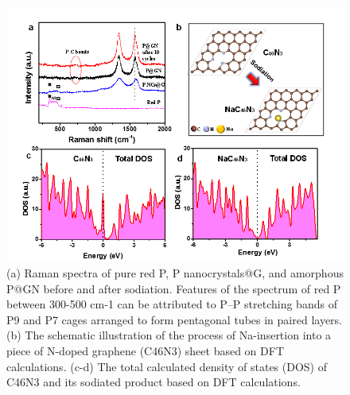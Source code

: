 \begin{figure}  
\includegraphics[width=\textwidth]{figures/figure4_4}
\caption[Raman spectra and DFT calculations]
{
(a) Raman spectra of pure red P, P nanocrystals@G, and amorphous P@GN before and after sodiation. Features of the spectrum of red P between 300-500 cm-1 can be attributed to P–P stretching bands of P9 and P7 cages arranged to form pentagonal tubes in paired layers. (b) The schematic illustration of the process of Na-insertion into a piece of N-doped graphene (C46N3) sheet based on DFT calculations. (c-d) The total calculated density of states (DOS) of C46N3 and its sodiated product  based on DFT calculations.
\label{fig:4_4}}
\end{figure}

